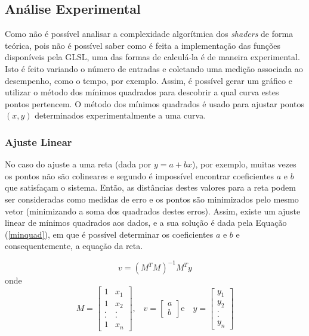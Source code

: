 {	\subsection{Análise Experimental}
	\label{metminqua}

	Como não é possível analisar a complexidade algorítmica dos \textit{shaders} de forma teórica, pois não é possível saber como é feita a implementação das funções disponíveis pela GLSL, uma das formas de calculá-la é de maneira experimental. Isto é feito variando o número de entradas e coletando uma medição associada ao desempenho, como o tempo, por exemplo. Assim, é possível gerar um gráfico e utilizar o método dos mínimos quadrados para descobrir a qual curva estes pontos pertencem. O método dos mínimos quadrados é usado para ajustar pontos $(x,y)$ determinados experimentalmente a uma curva. 

	\subsubsection{Ajuste Linear}

	No caso do ajuste a uma reta (dada por $y = a + bx$), por exemplo, muitas vezes os pontos não são colineares e segundo \cite{minq} é impossível encontrar coeficientes $a$ e $b$ que satisfaçam o sistema.  Então, as distâncias destes valores para a reta podem ser consideradas como medidas de erro e os pontos são minimizados pelo mesmo vetor (minimizando a soma dos quadrados destes erros).  Assim, existe um ajuste linear de mínimos quadrados aos dados, e a sua solução é dada pela Equação (\ref{minquad}), em que é possível determinar os coeficientes $a$ e $b$ e consequentemente, a equação da reta. 

	\begin{equation}
		v =( M^{T}M)^{-1}M^{T}y
	\label{minquad}
	\end{equation}
	onde
	\begin{equation}
	M = \left[\begin{array}{cc}
               	1 & x_{1} \\
               	1 & x_{2}  \\
		. & .  \\
               	. & .  \\
		1 & x_{n}
          	         \end{array}\right] \mbox{,} \quad
	v = \left[\begin{array}{c}
               	a \\
               	b  
          	         \end{array}\right] \mbox{e} \quad
	y = \left[\begin{array}{c}
               	y_{1} \\
               	y_{2}  \\
		.   \\
               	.   \\
		y_{n}
          	         \end{array}\right] 	
	\label{variaveis}
	\end{equation}

}
